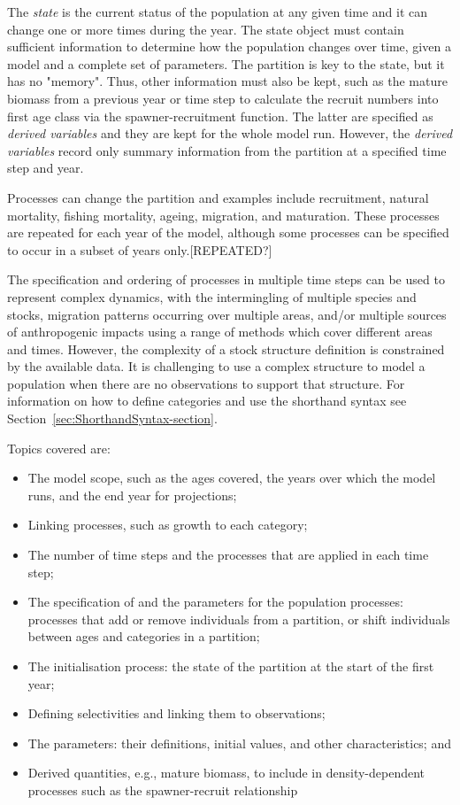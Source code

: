 The \textit{state} is the current status of the population at any given time and it can change one or more times during the year. The state object must contain sufficient information to determine how the population changes over time, given a model and a complete set of parameters. The partition is key to the state, but it has no "memory". Thus, other information must also be kept, such as the mature biomass from a previous year or time step to calculate the recruit numbers into first age class via the spawner-recruitment function. The latter are specified as \textit{derived variables} and they are kept for the whole model run. However, the \textit{derived variables}  record only summary information from the partition at a specified time step and year.

Processes can change the partition and examples include recruitment, natural mortality, fishing mortality, ageing, migration, and maturation. These processes are repeated for each year of the model, although some processes can be specified to occur in a subset of years only.[REPEATED?]

The specification and ordering of processes in multiple time steps can be used to represent complex dynamics, with the intermingling of multiple species and stocks, migration patterns occurring over multiple areas, and/or multiple sources of anthropogenic impacts using a range of methods which cover different areas and times.
However, the complexity of a stock structure definition is constrained by the available data. It is challenging to use a complex structure to model a population when there are no observations to support that structure.  For information on how to define categories and use the shorthand syntax see Section~\ref{sec:ShorthandSyntax-section}.

Topics covered are: 

\begin{itemize}
	\item The model scope, such as the ages covered, the years over which the model runs, and the end year for projections;
    \item Linking processes, such as growth to each category;
    \item The number of time steps and the processes that are applied in each time step;
    \item The specification of and the parameters for the population processes: processes that add or remove individuals from a partition, or shift individuals between ages and categories in a partition;
    \item The initialisation process: the state of the partition at the start of the first year;
   \item Defining selectivities and linking them to observations;
   \item The parameters: their definitions, initial values, and other characteristics; and
   \item Derived quantities, e.g., mature biomass, to include in density-dependent processes such as the spawner-recruit relationship
\end{itemize}

